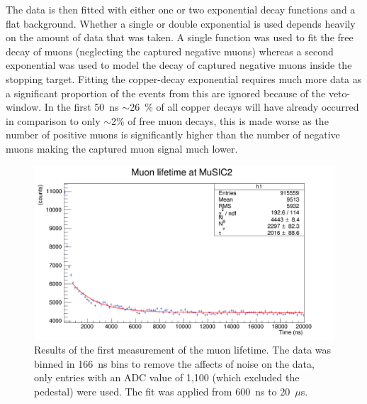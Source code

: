 The data is then fitted with either one or two exponential decay functions and a flat background. Whether a single or double exponential is used depends heavily on the amount of data that was taken. A single function was used to fit the free decay of muons (neglecting the captured negative muons) whereas a second exponential was used to model the decay of captured negative muons inside the stopping target. Fitting the copper-decay exponential requires much more data as a significant proportion of the events from this are ignored because of the veto-window. In the first 50~ns \(\sim\)26~\% of all copper decays will have already occurred in comparison to only \(\sim\)2\% of free muon decays, this is made worse as the number of positive muons is significantly higher than the number of negative muons making the captured muon signal much lower.

\begin{figure}[hptb]
  \centering
  \includegraphics[width=.9\textwidth]{images/lifetime/music2_mu_lifetime_good.png}
  \caption{Results of the first measurement of the muon lifetime. The data was binned in 166~ns bins to remove the affects of noise on the data, only entries with an ADC value of 1,100 (which excluded the pedestal) were used. The fit was applied from 600~ns to 20~\(\mu\)s.}
  \label{fig:music2_mu_lifetime}
\end{figure}

